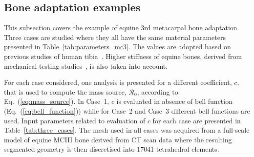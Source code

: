 \documentclass[11pt]{acmeArticle}
\numberwithin{equation}{section}
\begin{document}
\subsection{Bone adaptation examples}
\label{sec:numerical_examples:bone_adap}
This subsection covers the example of equine 3rd metacarpal bone adaptation.
Three cases are studied where they all have the same material parameters presented in Table~\ref{tab:parameters_mc3}.
The values are adopted based on previous studies of human tibia~\citep{Pang2012,Waffenschmidt2012}. 
Higher stiffness of equine bones, derived from mechanical testing studies~\citep{Les1994}, is also taken into account.

For each case considered, one analysis is presented for a different coefficient, $c$, that is used to compute the mass source, $\mathcal{R}_0$, according to Eq.~(\ref{eq:mass_source}).
In Case~1, $c$ is evaluated in absence of bell function (Eq.~(\ref{eq:bell_function})) while for Case~2 and Case~3 different bell functions are used.
Input parameters related to evaluation of $c$ for each case are presented in Table~\ref{tab:three_cases}. 
The mesh used in all cases was acquired from a full-scale model of equine MCIII bone derived from CT scan data where the resulting segmented geometry is then discretised into 17041 tetrahedral elements.
\end{document}
